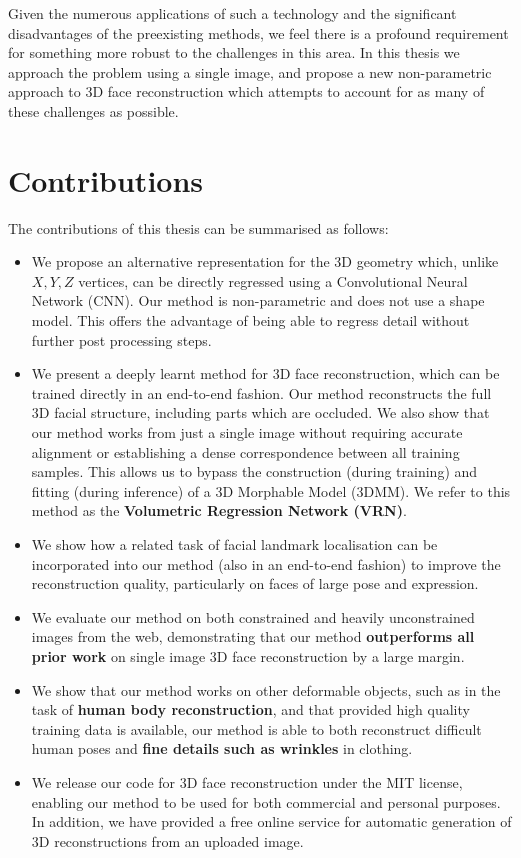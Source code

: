 Given the numerous applications of such a technology and the
significant disadvantages of the preexisting methods, we feel there is
a profound requirement for something more robust to the challenges in
this area. In this thesis we approach the problem using a single
image, and propose a new non-parametric approach to 3D face
reconstruction which attempts to account for as many of these
challenges as possible.

\section{Contributions}

The contributions of this thesis can be summarised as follows:

\begin{itemize}
\item %
  We propose an alternative representation for the 3D geometry which,
  unlike $X, Y, Z$ vertices, can be directly regressed using a
  Convolutional Neural Network (CNN). Our method is non-parametric and
  does not use a shape model. This offers the advantage of being able
  to regress detail without further post processing steps.

\item %
  We present a deeply learnt method for 3D face reconstruction, which
  can be trained directly in an end-to-end fashion. Our method
  reconstructs the full 3D facial structure, including parts which are
  occluded. We also show that our method works from just a single
  image without requiring accurate alignment or establishing a dense
  correspondence between all training samples.  This allows us to
  bypass the construction (during training) and fitting (during
  inference) of a 3D Morphable Model (3DMM).  We refer to this method
  as the \textbf{Volumetric Regression Network (VRN)}.

\item We show how a related task of facial landmark localisation can
  be incorporated into our method (also in an end-to-end fashion) to
  improve the reconstruction quality, particularly on faces of large
  pose and expression.

\item We evaluate our method on both constrained and heavily
  unconstrained images from the web, demonstrating that our method
  \textbf{outperforms all prior work} on single image 3D face
  reconstruction by a large margin.

\item We show that our method works on other deformable objects, such
  as in the task of \textbf{human body reconstruction}, and that
  provided high quality training data is available, our method is able
  to both reconstruct difficult human poses and \textbf{fine details
    such as wrinkles} in clothing.

\item We release our code for 3D face reconstruction under the MIT
  license, enabling our method to be used for both commercial and
  personal purposes. In addition, we have provided a free online
  service for automatic generation of 3D reconstructions from an
  uploaded image.
\end{itemize}

